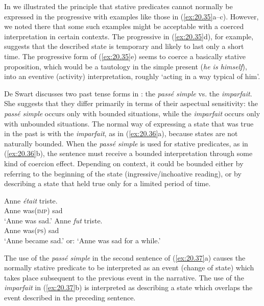 In  we illustrated the principle that stative predicates cannot normally be expressed in the progressive with examples like those in (\ref{ex:20.35}a--c). However, we noted there that some such examples might be acceptable with a coerced interpretation in certain contexts. The progressive in (\ref{ex:20.35}d), for example, suggests that the described state is temporary and likely to last only a short time. The progressive form of (\ref{ex:20.35}e) seems to coerce a basically stative proposition, which would be a tautology in the simple present (\textit{he is himself}), into an eventive (activity) interpretation, roughly ‘acting in a way typical of him’.

\newpage 
\ea \label{ex:20.35}
                       \z
\z


De Swart discusses two past tense forms in : the \textit{passé simple} vs. the \textit{imparfait}. She suggests that they differ primarily in terms of their aspectual sensitivity: the \textit{passé simple} occurs only with bounded situations, while the \textit{imparfait} occurs only with unbounded situations. The normal way of expressing a state that was true in the past is with the \textit{imparfait}, as in (\ref{ex:20.36}a), because states are not naturally bounded. When the \textit{passé simple} is used for stative predicates, as in (\ref{ex:20.36}b), the sentence must receive a bounded interpretation through some kind of coercion effect. Depending on context, it could be bounded either by referring to the beginning of the state (ingressive/inchoative reading), or by describing a state that held true only for a limited period of time.


\ea \label{ex:20.36}
\ea  \gll  Anne  \textit{était}  triste.\\
Anne  was(\textsc{imp})  sad\\
\glt ‘Anne was sad.’
\ex \gll Anne  \textit{fut}  triste.\\
Anne  was(\textsc{ps})  sad\\
\glt ‘Anne became sad.’ or: ‘Anne was sad for a while.’
\z \z


The use of the \textit{passé simple} in the second sentence of (\ref{ex:20.37}a) causes the normally stative predicate to be interpreted as an event (change of state) which takes place subsequent to the previous event in the narrative. The use of the \textit{imparfait} in (\ref{ex:20.37}b) is interpreted as describing a state which overlaps the event described in the preceding sentence.


